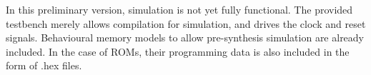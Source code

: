In this preliminary version, simulation is not yet fully functional. The
provided testbench merely allows compilation for simulation, and drives the clock
and reset signals. Behavioural memory models to allow pre-synthesis simulation
are already included. In the case of ROMs, their programming data is also
included in the form of .hex files.
